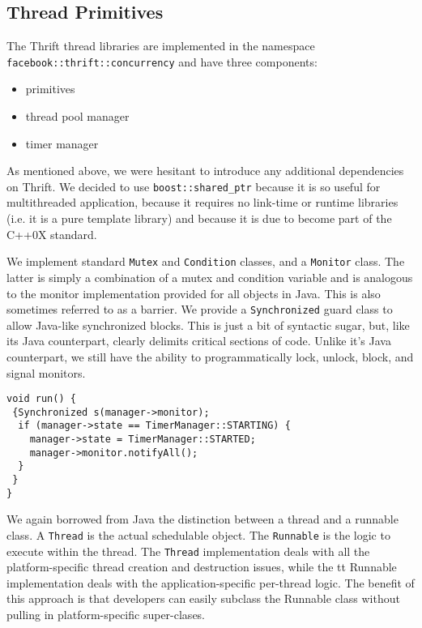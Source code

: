 \documentclass[nocopyrightspace,blockstyle]{sigplanconf}
\begin{document}
\subsection{Thread Primitives}

The Thrift thread libraries are implemented in the namespace\\
\texttt{facebook::thrift::concurrency} and have three components:
\begin{itemize}
\item primitives
\item thread pool manager
\item timer manager
\end{itemize}

As mentioned above, we were hesitant to introduce any additional dependencies
on Thrift. We decided to use \texttt{boost::shared\_ptr} because it is so 
useful for multithreaded application, because it requires no link-time or
runtime libraries (i.e. it is a pure template library) and because it is due
to become part of the C++0X standard.

We implement standard \texttt{Mutex} and \texttt{Condition} classes, and a
 \texttt{Monitor} class. The latter is simply a combination of a mutex and 
condition variable and is analogous to the monitor implementation provided for
all objects in Java. This is also sometimes referred to as a barrier. We 
provide a \texttt{Synchronized} guard class to allow Java-like synchronized blocks.
This is just a bit of syntactic sugar, but, like its Java counterpart, clearly 
delimits critical sections of code. Unlike it's Java counterpart, we still
have the ability to programmatically lock, unlock, block, and signal monitors.

\begin{verbatim}
void run() {
 {Synchronized s(manager->monitor);
  if (manager->state == TimerManager::STARTING) {
    manager->state = TimerManager::STARTED;
    manager->monitor.notifyAll();
  }
 }
}
\end{verbatim}

We again borrowed from Java the distinction between a thread and a runnable
class. A \texttt{Thread} is the actual schedulable object. The
\texttt{Runnable} is the logic to execute within the thread. 
The \texttt{Thread} implementation deals with all the platform-specific thread 
creation and destruction issues, while the {tt Runnable} implementation deals
with the application-specific per-thread logic. The benefit of this approach
is that developers can easily subclass the Runnable class without pulling in 
platform-specific super-clases.
\end{document}
